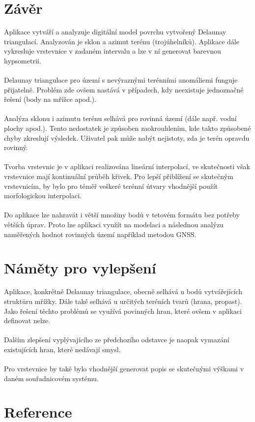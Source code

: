 \documentclass[a4paper, 12pt]{article}
\begin{document}
\clearpage

\section{Závěr}
Aplikace vytváří a analyzuje digitální model povrchu vytvořený Delaunay triangulací. Analyzován je sklon a azimut terénu (trojúhelníků). Aplikace dále vykresluje vrstevnice v zadaném intervalu a lze v ní generovat barevnou hypsometrii. \\
\\
Delaunay triangulace pro území s nevýraznými terénními anomáliemi funguje přijatelně. Problém zde ovšem nastává v případech, kdy neexistuje jednoznačné řešení (body na mřížce apod.).\\
\\
Analýza sklonu i azimutu terénu selhává pro rovinná území (dále např. vodní plochy apod.). Tento nedostatek je způsoben zaokrouhlením, kde takto způsobené chyby zkreslují výsledek. Uživatel pak může nabýt nejistoty, zda je terén opravdu rovinný.\\
\\
Tvorba vrstevnic je v aplikaci realizována lineární interpolací, ve skutečnosti však vrstevnice mají kontinuální průběh křivek. Pro lepší přiblížení se skutečným vrstevnicím, by bylo pro téměř veškeré terénní útvary vhodnější použít morfologickou interpolaci. \\
\\
Do aplikace lze nahravát i větší množiny bodů v tetovém formátu bez potřeby větších úprav. Proto lze aplikaci využít na modelaci a následnou analýzu naměřených hodnot rovinných území například metodou GNSS.
\section{Náměty pro vylepšení} 
Aplikace, konkrétně Delaunay triangulace, obecně selhává u bodů vytvářejících struktůru mřížky. Dále také selhává u určitých teréních tvarů (hrana, propast). Jako řešení těchto problémů se využívá povinných hran, které ovšem v aplikaci definovat nelze.\\
\\
Dalším zlepšení vyplývajícího ze předchozího odstavce je naopak vymazání existujících hran, které nedávají smysl.\\
\\
Pro vrstevnice by také bylo vhodnější generovat popis se skutečnými výškami v daném souřadnicovém systému. 

\section{Reference}
\end{document}
